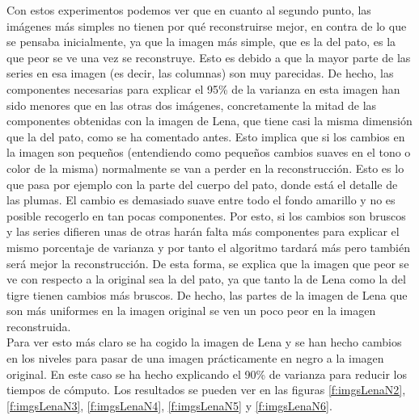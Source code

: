 Con estos experimentos podemos ver que en cuanto al segundo punto, las imágenes más simples no tienen por qué reconstruirse mejor, en contra de lo que se pensaba inicialmente, ya que la imagen más simple, que es la del pato, es la que peor se ve una vez se reconstruye. Esto es debido a que la mayor parte de las series en esa imagen (es decir, las columnas) son muy parecidas. De hecho, las componentes necesarias para explicar el 95\% de la varianza en esta imagen han sido menores que en las otras dos imágenes, concretamente la mitad de las componentes obtenidas con la imagen de Lena, que tiene casi la misma dimensión que la del pato, como se ha comentado antes. Esto implica que si los cambios en la imagen son pequeños (entendiendo como pequeños cambios suaves en el tono o color de la misma) normalmente se van a perder en la reconstrucción. Esto es lo que pasa por ejemplo con la parte del cuerpo del pato, donde está el detalle de las plumas. El cambio es demasiado suave entre todo el fondo amarillo y no es posible recogerlo en tan pocas componentes. Por esto, si los cambios son bruscos y las series difieren unas de otras harán falta más componentes para explicar el mismo porcentaje de varianza y por tanto el algoritmo tardará más pero también será mejor la reconstrucción. De esta forma, se explica que la imagen que peor se ve con respecto a la original sea la del pato, ya que tanto la de Lena como la del tigre tienen cambios más bruscos. De hecho, las partes de la imagen de Lena que son más uniformes en la imagen original se ven un poco peor en la imagen reconstruida.\\

Para ver esto más claro se ha cogido la imagen de Lena y se han hecho cambios en los niveles para pasar de una imagen prácticamente en negro a la imagen original. En este caso se ha hecho explicando el 90\% de varianza para reducir los tiempos de cómputo. Los resultados se pueden ver en las figuras \ref{f:imgsLenaN2}, \ref{f:imgsLenaN3}, \ref{f:imgsLenaN4}, \ref{f:imgsLenaN5} y \ref{f:imgsLenaN6}.\\

